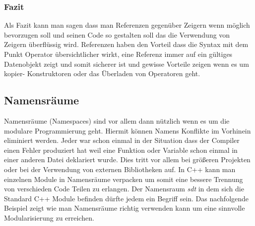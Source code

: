 \documentclass[MES,Master,ngerman]{twbook}%
\begin{document}
\subsubsection{Fazit}
Als Fazit kann man sagen dass man Referenzen gegenüber Zeigern wenn möglich bevorzugen soll und seinen Code so gestalten soll das die Verwendung von Zeigern überflüssig wird. Referenzen haben den Vorteil dass die Syntax mit dem Punkt Operator übersichtlicher wirkt, eine Referenz immer auf ein gültiges Datenobjekt zeigt und somit sicherer ist und gewisse Vorteile zeigen wenn es um kopier- Konstruktoren oder das Überladen von Operatoren geht.
\newpage
\subsection{Namensräume}
Namensräume (Namespaces) sind vor allem dann nützlich wenn es um die modulare Programmierung geht. Hiermit können Namens Konflikte im Vorhinein eliminiert werden. Jeder war schon einmal in der Situation dass der Compiler einen Fehler produziert hat weil eine Funktion oder Variable schon einmal in einer anderen Datei deklariert wurde. Dies tritt vor allem bei größeren Projekten oder bei der Verwendung von externen Bibliotheken auf. In C++ kann man einzelnen Module in Namensräume verpacken um somit eine bessere Trennung von verschieden Code Teilen zu erlangen. Der Namensraum \textit{sdt} in dem sich die Standard C++ Module befinden dürfte jedem ein Begriff sein. Das nachfolgende Beispiel zeigt wie man Namensräume richtig verwenden kann um eine sinnvolle Modularisierung zu erreichen. \newline
\end{document}
